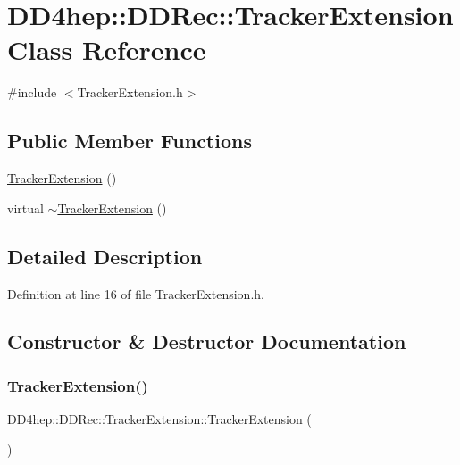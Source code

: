 \hypertarget{class_d_d4hep_1_1_d_d_rec_1_1_tracker_extension}{}\section{D\+D4hep\+:\+:D\+D\+Rec\+:\+:Tracker\+Extension Class Reference}
\label{class_d_d4hep_1_1_d_d_rec_1_1_tracker_extension}


{\ttfamily \#include $<$Tracker\+Extension.\+h$>$}

\subsection*{Public Member Functions}
\begin{DoxyCompactItemize}
\item 
\hyperlink{class_d_d4hep_1_1_d_d_rec_1_1_tracker_extension_a8b8d1e0e426ac0a878610c1c8e5f5640}{Tracker\+Extension} ()
\item 
virtual \hyperlink{class_d_d4hep_1_1_d_d_rec_1_1_tracker_extension_a0220264e3c52c6b3f17b29bc817894ee}{$\sim$\+Tracker\+Extension} ()
\end{DoxyCompactItemize}


\subsection{Detailed Description}


Definition at line 16 of file Tracker\+Extension.\+h.



\subsection{Constructor \& Destructor Documentation}
\hypertarget{class_d_d4hep_1_1_d_d_rec_1_1_tracker_extension_a8b8d1e0e426ac0a878610c1c8e5f5640}{}\label{class_d_d4hep_1_1_d_d_rec_1_1_tracker_extension_a8b8d1e0e426ac0a878610c1c8e5f5640} 
\subsubsection{\texorpdfstring{Tracker\+Extension()}{TrackerExtension()}}
{\footnotesize\ttfamily D\+D4hep\+::\+D\+D\+Rec\+::\+Tracker\+Extension\+::\+Tracker\+Extension (\begin{DoxyParamCaption}{ }\end{DoxyParamCaption})}

